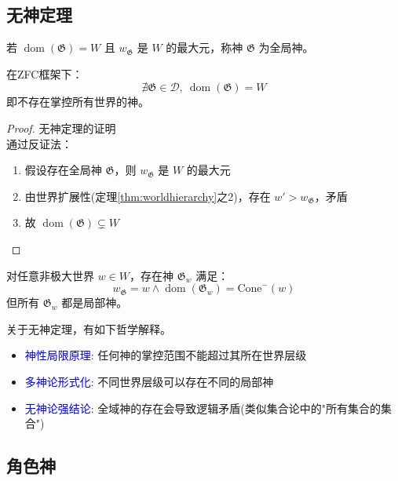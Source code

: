 \documentclass[lang=cn,newtx,10pt,scheme=chinese]{elegantbook}
\newcommand{\dom}{\mathop{\mathrm{dom}}} %
\newcommand{\Divine}{\mathcal{D}} %
\newcommand{\G}{\mathfrak{G}} %
\begin{document}
\subsection{无神定理}

\begin{definition}[全局神]
    若 $\dom(\G) = W$ 且 $w_\G$ 是 $W$ 的最大元，称神 $\G$ 为全局神。
\end{definition}

\begin{theorem}[无神定理]
    在ZFC框架下：
    \[
        \nexists \G \in \Divine,\ \dom(\G) = W
    \]
    即不存在掌控所有世界的神。
\end{theorem}

\begin{proof}{无神定理的证明}\\
    通过反证法：
    \begin{enumerate}
        \item 假设存在全局神 $\G$，则 $w_\G$ 是 $W$ 的最大元
        \item 由世界扩展性(定理\ref{thm:worldhierarchy}之2)，存在 $w' > w_\G$，矛盾
        \item 故 $\dom(\G) \subsetneq W$
    \end{enumerate}
\end{proof}

\begin{corollary}[相对有神性]
    对任意非极大世界 $w \in W$，存在神 $\G_w$ 满足：
    \[
        w_\G = w \land \dom(\G_w) = \mathrm{Cone}^-(w)
    \]
    但所有 $\G_w$ 都是局部神。
\end{corollary}

关于无神定理，有如下哲学解释。
\begin{itemize}
    \item \textcolor{blue}{神性局限原理}: 任何神的掌控范围不能超过其所在世界层级
    \item \textcolor{blue}{多神论形式化}: 不同世界层级可以存在不同的局部神
    \item \textcolor{blue}{无神论强结论}: 全域神的存在会导致逻辑矛盾(类似集合论中的"所有集合的集合")
\end{itemize}

\subsection{角色神}
\end{document}
